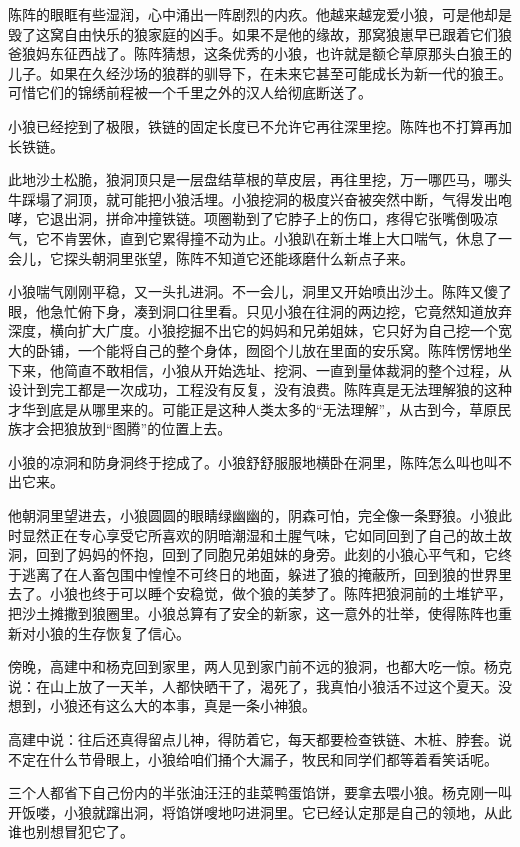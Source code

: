 \par 陈阵的眼眶有些湿润，心中涌出一阵剧烈的内疚。他越来越宠爱小狼，可是他却是毁了这窝自由快乐的狼家庭的凶手。如果不是他的缘故，那窝狼崽早已跟着它们狼爸狼妈东征西战了。陈阵猜想，这条优秀的小狼，也许就是额仑草原那头白狼王的儿子。如果在久经沙场的狼群的驯导下，在未来它甚至可能成长为新一代的狼王。可惜它们的锦绣前程被一个千里之外的汉人给彻底断送了。
\par 小狼已经挖到了极限，铁链的固定长度已不允许它再往深里挖。陈阵也不打算再加长铁链。
\par 此地沙土松脆，狼洞顶只是一层盘结草根的草皮层，再往里挖，万一哪匹马，哪头牛踩塌了洞顶，就可能把小狼活埋。小狼挖洞的极度兴奋被突然中断，气得发出咆哮，它退出洞，拼命冲撞铁链。项圈勒到了它脖子上的伤口，疼得它张嘴倒吸凉气，它不肯罢休，直到它累得撞不动为止。小狼趴在新土堆上大口喘气，休息了一会儿，它探头朝洞里张望，陈阵不知道它还能琢磨什么新点子来。
\par 小狼喘气刚刚平稳，又一头扎进洞。不一会儿，洞里又开始喷出沙土。陈阵又傻了眼，他急忙俯下身，凑到洞口往里看。只见小狼在往洞的两边挖，它竟然知道放弃深度，横向扩大广度。小狼挖掘不出它的妈妈和兄弟姐妹，它只好为自己挖一个宽大的卧铺，一个能将自己的整个身体，囫囵个儿放在里面的安乐窝。陈阵愣愣地坐下来，他简直不敢相信，小狼从开始选址、挖洞、一直到量体裁洞的整个过程，从设计到完工都是一次成功，工程没有反复，没有浪费。陈阵真是无法理解狼的这种才华到底是从哪里来的。可能正是这种人类太多的“无法理解”，从古到今，草原民族才会把狼放到“图腾”的位置上去。
\par 小狼的凉洞和防身洞终于挖成了。小狼舒舒服服地横卧在洞里，陈阵怎么叫也叫不出它来。
\par 他朝洞里望进去，小狼圆圆的眼睛绿幽幽的，阴森可怕，完全像一条野狼。小狼此时显然正在专心享受它所喜欢的阴暗潮湿和土腥气味，它如同回到了自己的故土故洞，回到了妈妈的怀抱，回到了同胞兄弟姐妹的身旁。此刻的小狼心平气和，它终于逃离了在人畜包围中惶惶不可终日的地面，躲进了狼的掩蔽所，回到狼的世界里去了。小狼也终于可以睡个安稳觉，做个狼的美梦了。陈阵把狼洞前的土堆铲平，把沙土摊撒到狼圈里。小狼总算有了安全的新家，这一意外的壮举，使得陈阵也重新对小狼的生存恢复了信心。
\par 傍晚，高建中和杨克回到家里，两人见到家门前不远的狼洞，也都大吃一惊。杨克说：在山上放了一天羊，人都快晒干了，渴死了，我真怕小狼活不过这个夏天。没想到，小狼还有这么大的本事，真是一条小神狼。
\par 高建中说：往后还真得留点儿神，得防着它，每天都要检查铁链、木桩、脖套。说不定在什么节骨眼上，小狼给咱们捅个大漏子，牧民和同学们都等着看笑话呢。
\par 三个人都省下自己份内的半张油汪汪的韭菜鸭蛋馅饼，要拿去喂小狼。杨克刚一叫开饭喽，小狼就蹿出洞，将馅饼嗖地叼进洞里。它已经认定那是自己的领地，从此谁也别想冒犯它了。
